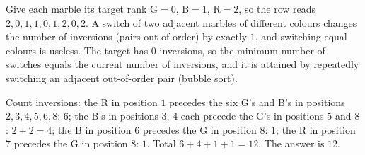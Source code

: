 Give each marble its target rank G$=0$, B$=1$, R$=2$, so the row reads $2,0,1,1,0,1,2,0,2$. A switch of two adjacent marbles of different colours changes the number of inversions (pairs out of order) by exactly $1$, and switching equal colours is useless. The target has $0$ inversions, so the minimum number of switches equals the current number of inversions, and it is attained by repeatedly switching an adjacent out-of-order pair (bubble sort).

Count inversions: the R in position $1$ precedes the six G's and B's in positions $2,3,4,5,6,8$: $6$; the B's in positions $3$, $4$ each precede the G's in positions $5$ and $8$: $2+2=4$; the B in position $6$ precedes the G in position $8$: $1$; the R in position $7$ precedes the G in position $8$: $1$. Total $6+4+1+1=12$. The answer is $\boxed{12}$.
